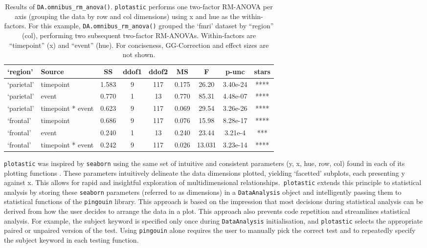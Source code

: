 \begin{table}[H]
    \small
    \centering
    \caption{Results of \texttt{DA.omnibus\_rm\_anova()}. \texttt{plotastic}
        performs one two-factor RM-ANOVA per axis (grouping the data by row and
        col dimensions) using x and hue as the within-factors. For this example,
        \texttt{DA.omnibus\_rm\_anova()} grouped the `fmri' dataset by ``region''
        (col), performing two subsequent two-factor RM-ANOVAs. Within-factors are
        ``timepoint'' (x) and ``event'' (hue). For conciseness, GG-Correction and
        effect sizes are not shown.}
    \begin{tabular}{llccccccc}
        \hline
        `region'   & Source            & SS    & ddof1 & ddof2 & MS    & F      & p-unc    & stars \\
        \hline
        `parietal' & timepoint         & 1.583 & 9     & 117   & 0.175 & 26.20  & 3.40e-24 & ****  \\
        `parietal' & event             & 0.770 & 1     & 13    & 0.770 & 85.31  & 4.48e-07 & ****  \\
        `parietal' & timepoint * event & 0.623 & 9     & 117   & 0.069 & 29.54  & 3.26e-26 & ****  \\
        `frontal'  & timepoint         & 0.686 & 9     & 117   & 0.076 & 15.98  & 8.28e-17 & ****  \\
        `frontal'  & event             & 0.240 & 1     & 13    & 0.240 & 23.44  & 3.21e-4  & ***   \\
        `frontal'  & timepoint * event & 0.242 & 9     & 117   & 0.026 & 13.031 & 3.23e-14 & ****  \\
        \hline
    \end{tabular}
    \label{tab:RMANOVA}
    \vspace{\vfull} %
\end{table}




\texttt{plotastic} was inspired by \texttt{seaborn} using the same set of intuitive
and consistent parameters (y, x, hue, row, col) found in each of its
plotting functions \cite{waskomSeabornStatisticalData2021}. These parameters
intuitively delineate the data dimensions plotted, yielding `facetted'
subplots, each presenting y against x. This allows for rapid and
insightful exploration of multidimensional relationships.~\texttt{plotastic}
extends this principle to statistical analysis by storing these
\texttt{seaborn} parameters (referred to as dimensions) in a \texttt{DataAnalysis}
object and intelligently passing them to statistical functions of the
\texttt{pingouin} library. This approach is based on the impression that most
decisions during statistical analysis can be derived from how the user
decides to arrange the data in a plot. This approach also prevents code
repetition and streamlines statistical analysis. For example, the
subject keyword is specified only once during \texttt{DataAnalysis}
initialisation, and \texttt{plotastic} selects the appropriate paired or
unpaired version of the test. Using \texttt{pingouin} alone requires the user
to manually pick the correct test and to repeatedly specify the subject
keyword in each testing function.

